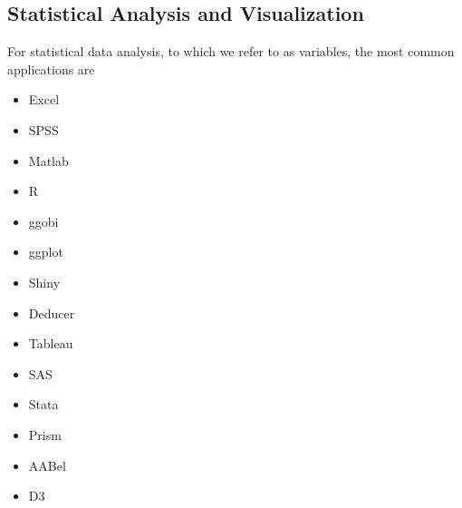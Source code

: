 \begin{table}
	\centering
		\begin{tabular}
			
		\end{tabular}
	\label{tab_related_applications}
\end{table}

\subsection{Statistical Analysis and Visualization}
For statistical data analysis, to which we refer to as variables, the most common applications are
\begin{itemize}
	\item Excel
	\item SPSS
	\item Matlab
	\item R
	\item ggobi
	\item ggplot
	\item Shiny
	\item Deducer
	\item Tableau
	\item SAS
	\item Stata
	\item Prism
	\item AABel
	\item D3
\end{itemize}






